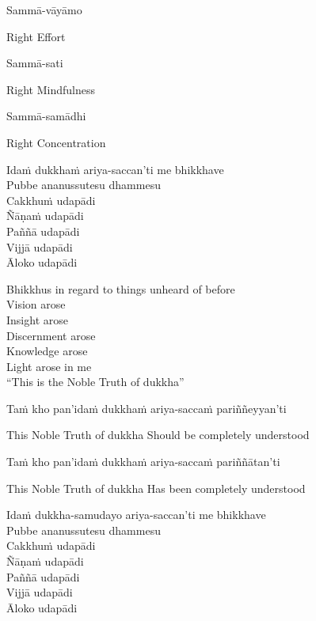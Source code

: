 Sammā-vāyāmo

\begin{cprenglish}
  Right Effort
\end{cprenglish}

Sammā-sati

\begin{cprenglish}
  Right Mindfulness
\end{cprenglish}

Sammā-samādhi

\begin{cprenglish}
  Right Concentration
\end{cprenglish}

Idaṁ dukkhaṁ ariya-saccan’ti me bhikkhave\\
Pubbe ananussutesu dhammesu\\
Cakkhuṁ udapādi\\
Ñāṇaṁ udapādi\\
Paññā udapādi\\
Vijjā udapādi\\
Āloko udapādi

\begin{cprenglish}
  Bhikkhus in regard to things unheard of before\\
  Vision arose\\
  Insight arose\\
  Discernment arose\\
  Knowledge arose\\
  Light arose in me\\
  “This is the Noble Truth of dukkha”
\end{cprenglish}

Taṁ kho pan’idaṁ dukkhaṁ ariya-saccaṁ pariññeyyan’ti

\begin{cprenglish}
  This Noble Truth of dukkha
  Should be completely understood
\end{cprenglish}

Taṁ kho pan’idaṁ dukkhaṁ ariya-saccaṁ pariññātan’ti

\begin{cprenglish}
  This Noble Truth of dukkha
  Has been completely understood
\end{cprenglish}

Idaṁ dukkha-samudayo ariya-saccan’ti me bhikkhave\\
Pubbe ananussutesu dhammesu\\
Cakkhuṁ udapādi\\
Ñāṇaṁ udapādi\\
Paññā udapādi\\
Vijjā udapādi\\
Āloko udapādi


